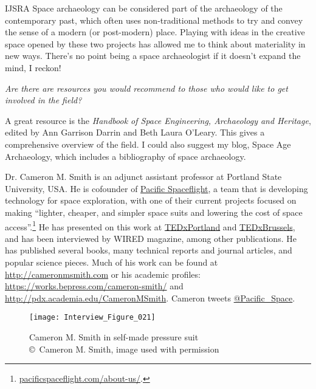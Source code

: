 \begin{labeling}{IJSRA}
	Space archaeology can be considered part of the archaeology of the contemporary past, which often uses non-traditional methods to try and convey the sense of a modern (or post-modern) place. Playing with ideas in the creative space opened by these two projects has allowed me to think about materiality in new ways. There’s no point being a space archaeologist if it doesn’t expand the mind, I reckon!

	\item[IJSRA] \emph{Are there are resources you would recommend to those who would like to get involved in the field?}

	\item[AG] A great resource is the \emph{Handbook of Space Engineering, Archaeology and Heritage}, edited by Ann Garrison Darrin and Beth Laura O’Leary. This gives a comprehensive overview of the field. I could also suggest my blog, Space Age Archaeology, which includes a bibliography of space archaeology.

\end{labeling}

\IJSRAseparator


Dr. Cameron M. Smith is an adjunct assistant professor at Portland State University, USA. He is cofounder of \href{http://pacificspaceflight.com}{Pacific Spaceflight}, a team that is developing technology for space exploration, with one of their current projects focused on making “lighter, cheaper, and simpler space suits and lowering the cost of space access”.\footnote{\url{pacificspaceflight.com/about-us/}.} He has presented on this work at \href{https://www.youtube.com/watch?v=C17yk-xsZpA}{TEDxPortland} and \href{https://www.youtube.com/watch?v=bMlL0aV75VY}{TEDxBrussels}, and has been interviewed by WIRED magazine, among other publications. He has published several books, many technical reports and journal articles, and popular science pieces. Much of his work can be found at \href{http://cameronmsmith.com}{http://cameronmsmith.com} or his academic profiles: \href{https://works.bepress.com/cameron-smith/}{https://works.bepress.com/cameron-smith/} and \href{http://pdx.academia.edu/CameronMSmith}{http://pdx.academia.edu/CameronMSmith}. Cameron tweets \href{<twitter.com/pacific_space>}{@Pacific\_Space}.

\begin{figure}[!htb]
	\texttt{[image: Interview\_Figure\_021]}
	\centering
	\caption{Cameron M. Smith in self-made pressure suit
		{\normalfont\scriptsize \\ \copyright\ Cameron M. Smith, image used with permission
	}}
	\label{Interview_Figure_021}
\end{figure}

